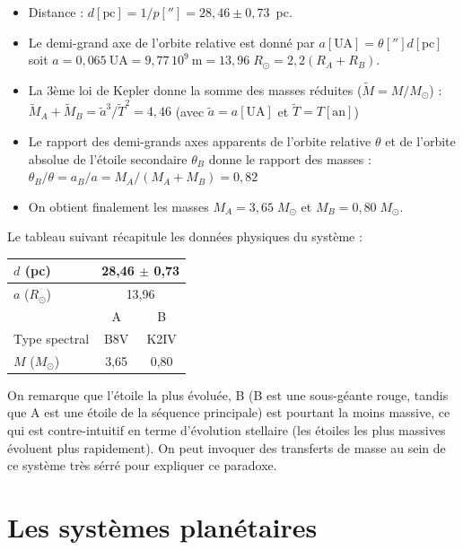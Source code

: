 \documentclass[a4paper,10pt]{report}
\newcommand{\e}[1]{\ensuremath{\, 10^{#1}}}
\newcommand{\UA}{\ensuremath{\textrm{UA}}}
\renewcommand{\u}[1]{\ensuremath{\mathrm{#1}}} %
\begin{document}
\begin{Answer}
  \begin{itemize}
  \item Distance : $d [\u{pc}] = 1/p[''] = 28,46 \pm 0,73$~pc.
  \item Le demi-grand axe de l'orbite relative est donné par $a [\UA]
    = \theta [''] d [\u{pc}]$ soit $a = 0,065~\UA = 9,77\e{9}~\u{m} =
    13,96\;R_{\odot} = 2,2 (R_{A}+R_{B})$.
  \item La 3ème loi de Kepler donne la somme des masses réduites
    ($\tilde{M} = M/M_{\odot}$) : $\tilde{M}_A + \tilde{M}_B =
    \tilde{a}^3/\tilde{T}^2 = 4,46$ (avec $\tilde{a} = a[\UA]$ et
    $\tilde{T} = T[\u{an}]$)
  \item Le rapport des demi-grands axes apparents de l'orbite relative
    $\theta$ et de l'orbite absolue de l'étoile secondaire $\theta_B$
    donne le rapport des masses : $\theta_B / \theta = a_B / a = M_A /
    (M_A + M_B) = 0,82$
  \item On obtient finalement les masses $M_A = 3,65\;M_{\odot}$ et $M_B =
    0,80\;M_{\odot}$.
  \end{itemize}

  Le tableau suivant récapitule les données physiques du système :
  \begin{center}
    \begin{tabular}{|l|c|c|}
      \hline
      $d$ (pc) & \multicolumn{2}{c|}{28,46 $\pm$ 0,73} \\
      \hline
      $a$ ($R_{\odot}$) &  \multicolumn{2}{c|}{13,96} \\
      \hline
      & A & B \\
      \hline
      Type spectral & B8V & K2IV \\
      \hline
      $M$ ($M_{\odot}$) & 3,65 & 0,80 \\
      \hline
    \end{tabular}
  \end{center}
  On remarque que l'étoile la plus évoluée, B (B est une sous-géante
  rouge, tandis que A est une étoile de la séquence principale) est
  pourtant la moins massive, ce qui est contre-intuitif en terme
  d'évolution stellaire (les étoiles les plus massives évoluent plus
  rapidement). On peut invoquer des transferts de masse au sein de ce
  système très sérré pour expliquer ce paradoxe.
\end{Answer}

\section{Les systèmes planétaires}
\end{document}
